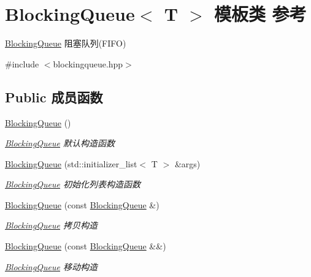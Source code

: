 \hypertarget{classBlockingQueue}{}\section{Blocking\+Queue$<$ T $>$ 模板类 参考}
\label{classBlockingQueue}


\hyperlink{classBlockingQueue}{Blocking\+Queue} 阻塞队列(\+F\+I\+F\+O)  




{\ttfamily \#include $<$blockingqueue.\+hpp$>$}

\subsection*{Public 成员函数}
\begin{DoxyCompactItemize}
\item 
\mbox{\label{classBlockingQueue_a42f821a61ba22ba27e6d1a434ab27eb2}} 
\hyperlink{classBlockingQueue_a42f821a61ba22ba27e6d1a434ab27eb2}{Blocking\+Queue} ()
\begin{DoxyCompactList}\small\item\em \hyperlink{classBlockingQueue}{Blocking\+Queue} 默认构造函数 \end{DoxyCompactList}\item 
\hyperlink{classBlockingQueue_a265931efcceccd5c99ac76178507559b}{Blocking\+Queue} (std\+::initializer\+\_\+list$<$ T $>$ \&args)
\begin{DoxyCompactList}\small\item\em \hyperlink{classBlockingQueue}{Blocking\+Queue} 初始化列表构造函数 \end{DoxyCompactList}\item 
\hyperlink{classBlockingQueue_a2f2b1e4d887d77a81fddabd44c5cdbfd}{Blocking\+Queue} (const \hyperlink{classBlockingQueue}{Blocking\+Queue} \&)
\begin{DoxyCompactList}\small\item\em \hyperlink{classBlockingQueue}{Blocking\+Queue} 拷贝构造 \end{DoxyCompactList}\item 
\hyperlink{classBlockingQueue_ab7dbc308989dda7bef2f884a2703c806}{Blocking\+Queue} (const \hyperlink{classBlockingQueue}{Blocking\+Queue} \&\&)
\begin{DoxyCompactList}\small\item\em \hyperlink{classBlockingQueue}{Blocking\+Queue} 移动构造 \end{DoxyCompactList}\item 

\end{DoxyCompactItemize}
